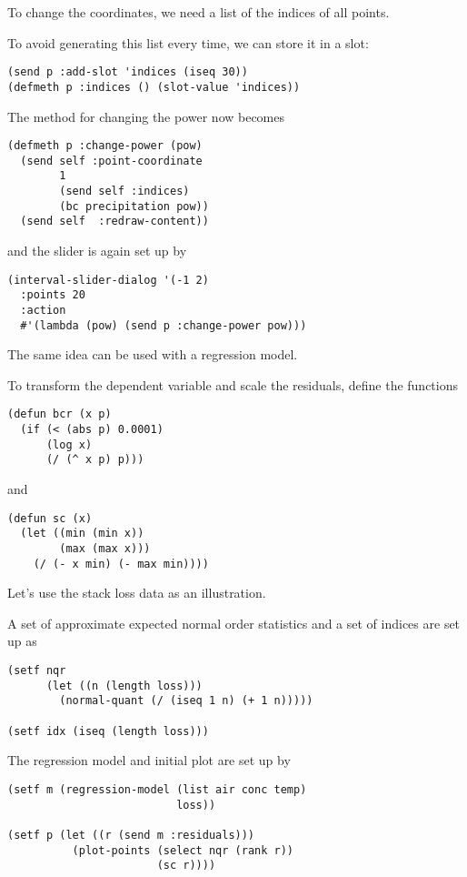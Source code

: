 \begin{slide}{}
To change the coordinates, we need a list of the indices of all
points.

To avoid generating this list every time, we can store it in a slot:
{\Large
\begin{verbatim}
(send p :add-slot 'indices (iseq 30))
(defmeth p :indices () (slot-value 'indices))
\end{verbatim}}
The method for changing the power now becomes
{\Large
\begin{verbatim}
(defmeth p :change-power (pow)
  (send self :point-coordinate
        1
        (send self :indices)
        (bc precipitation pow))
  (send self  :redraw-content))
\end{verbatim}}
and the slider is again set up by
{\Large
\begin{verbatim}
(interval-slider-dialog '(-1 2) 
  :points 20
  :action
  #'(lambda (pow) (send p :change-power pow)))
\end{verbatim}}
\end{slide}

\begin{slide}{}
The same idea can be used with a regression model.

To transform the dependent variable and scale the residuals,
define the functions
{\Large
\begin{verbatim}
(defun bcr (x p)
  (if (< (abs p) 0.0001)
      (log x)
      (/ (^ x p) p)))
\end{verbatim}}
and
{\Large
\begin{verbatim}
(defun sc (x)
  (let ((min (min x))
        (max (max x)))
    (/ (- x min) (- max min))))
\end{verbatim}}
\end{slide}

\begin{slide}{}
Let's use the stack loss data as an illustration.

A set of approximate expected normal order statistics 
and a set of indices are set up as
{\Large
\begin{verbatim}
(setf nqr
      (let ((n (length loss)))
        (normal-quant (/ (iseq 1 n) (+ 1 n)))))

(setf idx (iseq (length loss)))
\end{verbatim}}
The regression model and initial plot are set up by
{\Large
\begin{verbatim}
(setf m (regression-model (list air conc temp)
                          loss))

(setf p (let ((r (send m :residuals)))
          (plot-points (select nqr (rank r))
                       (sc r))))
\end{verbatim}}
\end{slide}

